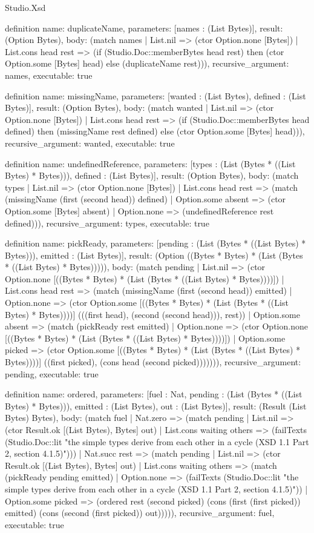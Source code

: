 \begin{lexlean}{Studio.Xsd}
\begin{semanticmodule}
definition{
  name: duplicateName,
  parameters: [names : (List Bytes)],
  result: (Option Bytes),
  body: (match names
    | List.nil => (ctor Option.none [Bytes])
    | List.cons head rest => (if (Studio.Doc::memberBytes head rest) then (ctor Option.some [Bytes] head) else (duplicateName rest))),
  recursive_argument: names,
  executable: true
}

definition{
  name: missingName,
  parameters: [wanted : (List Bytes), defined : (List Bytes)],
  result: (Option Bytes),
  body: (match wanted
    | List.nil => (ctor Option.none [Bytes])
    | List.cons head rest => (if (Studio.Doc::memberBytes head defined) then (missingName rest defined) else (ctor Option.some [Bytes] head))),
  recursive_argument: wanted,
  executable: true
}

definition{
  name: undefinedReference,
  parameters: [types : (List (Bytes * ((List Bytes) * Bytes))), defined : (List Bytes)],
  result: (Option Bytes),
  body: (match types
    | List.nil => (ctor Option.none [Bytes])
    | List.cons head rest => (match (missingName (first (second head)) defined)
      | Option.some absent => (ctor Option.some [Bytes] absent)
      | Option.none => (undefinedReference rest defined))),
  recursive_argument: types,
  executable: true
}

definition{
  name: pickReady,
  parameters: [pending : (List (Bytes * ((List Bytes) * Bytes))), emitted : (List Bytes)],
  result: (Option ((Bytes * Bytes) * (List (Bytes * ((List Bytes) * Bytes))))),
  body: (match pending
    | List.nil => (ctor Option.none [((Bytes * Bytes) * (List (Bytes * ((List Bytes) * Bytes))))])
    | List.cons head rest => (match (missingName (first (second head)) emitted)
      | Option.none => (ctor Option.some [((Bytes * Bytes) * (List (Bytes * ((List Bytes) * Bytes))))] (((first head), (second (second head))), rest))
      | Option.some absent => (match (pickReady rest emitted)
        | Option.none => (ctor Option.none [((Bytes * Bytes) * (List (Bytes * ((List Bytes) * Bytes))))])
        | Option.some picked => (ctor Option.some [((Bytes * Bytes) * (List (Bytes * ((List Bytes) * Bytes))))] ((first picked), (cons head (second picked))))))),
  recursive_argument: pending,
  executable: true
}

definition{
  name: ordered,
  parameters: [fuel : Nat, pending : (List (Bytes * ((List Bytes) * Bytes))), emitted : (List Bytes), out : (List Bytes)],
  result: (Result (List Bytes) Bytes),
  body: (match fuel
    | Nat.zero => (match pending
      | List.nil => (ctor Result.ok [(List Bytes), Bytes] out)
      | List.cons waiting others => (failTexts (Studio.Doc::lit "the simple types derive from each other in a cycle (XSD 1.1 Part 2, section 4.1.5)")))
    | Nat.succ rest => (match pending
      | List.nil => (ctor Result.ok [(List Bytes), Bytes] out)
      | List.cons waiting others => (match (pickReady pending emitted)
        | Option.none => (failTexts (Studio.Doc::lit "the simple types derive from each other in a cycle (XSD 1.1 Part 2, section 4.1.5)"))
        | Option.some picked => (ordered rest (second picked) (cons (first (first picked)) emitted) (cons (second (first picked)) out))))),
  recursive_argument: fuel,
  executable: true
}


\end{semanticmodule}
\end{lexlean}
